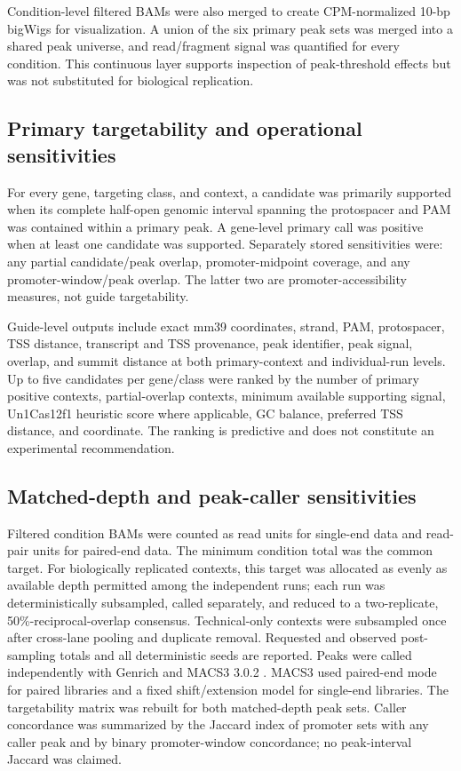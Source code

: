 \documentclass[11pt]{article}
\begin{document}
Condition-level filtered BAMs were also merged to create CPM-normalized 10-bp bigWigs for visualization. A union of the six primary peak sets was merged into a shared peak universe, and read/fragment signal was quantified for every condition. This continuous layer supports inspection of peak-threshold effects but was not substituted for biological replication.

\subsection{Primary targetability and operational sensitivities}

For every gene, targeting class, and context, a candidate was primarily supported when its complete half-open genomic interval spanning the protospacer and PAM was contained within a primary peak. A gene-level primary call was positive when at least one candidate was supported. Separately stored sensitivities were: any partial candidate/peak overlap, promoter-midpoint coverage, and any promoter-window/peak overlap. The latter two are promoter-accessibility measures, not guide targetability.

Guide-level outputs include exact mm39 coordinates, strand, PAM, protospacer, TSS distance, transcript and TSS provenance, peak identifier, peak signal, overlap, and summit distance at both primary-context and individual-run levels. Up to five candidates per gene/class were ranked by the number of primary positive contexts, partial-overlap contexts, minimum available supporting signal, Un1Cas12f1 heuristic score where applicable, GC balance, preferred TSS distance, and coordinate. The ranking is predictive and does not constitute an experimental recommendation.

\subsection{Matched-depth and peak-caller sensitivities}

Filtered condition BAMs were counted as read units for single-end data and read-pair units for paired-end data. The minimum condition total was the common target. For biologically replicated contexts, this target was allocated as evenly as available depth permitted among the independent runs; each run was deterministically subsampled, called separately, and reduced to a two-replicate, 50\%-reciprocal-overlap consensus. Technical-only contexts were subsampled once after cross-lane pooling and duplicate removal. Requested and observed post-sampling totals and all deterministic seeds are reported. Peaks were called independently with Genrich and MACS3 3.0.2 \citep{zhang2008macs}. MACS3 used paired-end mode for paired libraries and a fixed shift/extension model for single-end libraries. The targetability matrix was rebuilt for both matched-depth peak sets. Caller concordance was summarized by the Jaccard index of promoter sets with any caller peak and by binary promoter-window concordance; no peak-interval Jaccard was claimed.
\end{document}
